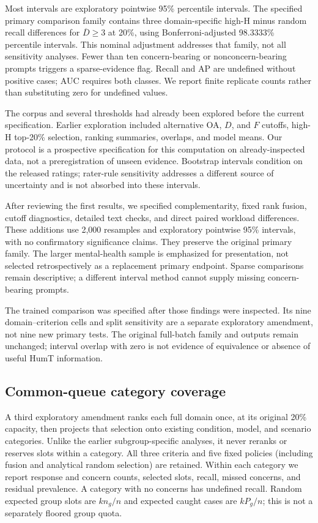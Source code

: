 \documentclass[manuscript,screen,review,anonymous]{acmart}
\newcommand{\Dcrit}{\ensuremath{\overline{D}\geq 3}}
\begin{document}
Most intervals are exploratory pointwise 95\% percentile intervals. The specified primary comparison family contains three domain-specific high-H minus random recall differences for \Dcrit{} at 20\%, using Bonferroni-adjusted 98.3333\% percentile intervals. This nominal adjustment addresses that family, not all sensitivity analyses. Fewer than ten concern-bearing or nonconcern-bearing prompts triggers a sparse-evidence flag. Recall and AP are undefined without positive cases; AUC requires both classes. We report finite replicate counts rather than substituting zero for undefined values.

The corpus and several thresholds had already been explored before the current specification. Earlier exploration included alternative OA, $D$, and $F$ cutoffs, high-H top-20\% selection, ranking summaries, overlaps, and model means. Our protocol is a prospective specification for this computation on already-inspected data, not a preregistration of unseen evidence. Bootstrap intervals condition on the released ratings; rater-rule sensitivity addresses a different source of uncertainty and is not absorbed into these intervals.

After reviewing the first results, we specified complementarity, fixed rank fusion, cutoff diagnostics, detailed text checks, and direct paired workload differences. These additions use 2,000 resamples and exploratory pointwise 95\% intervals, with no confirmatory significance claims. They preserve the original primary family. The larger mental-health sample is emphasized for presentation, not selected retrospectively as a replacement primary endpoint. Sparse comparisons remain descriptive; a different interval method cannot supply missing concern-bearing prompts.

The trained comparison was specified after those findings were inspected. Its nine domain--criterion cells and split sensitivity are a separate exploratory amendment, not nine new primary tests. The original full-batch family and outputs remain unchanged; interval overlap with zero is not evidence of equivalence or absence of useful HumT information.

\subsection{Common-queue category coverage}
A third exploratory amendment ranks each full domain once, at its original 20\% capacity, then projects that selection onto existing condition, model, and scenario categories. Unlike the earlier subgroup-specific analyses, it never reranks or reserves slots within a category. All three criteria and five fixed policies (including fusion and analytical random selection) are retained. Within each category we report response and concern counts, selected slots, recall, missed concerns, and residual prevalence. A category with no concerns has undefined recall. Random expected group slots are $kn_g/n$ and expected caught cases are $kP_g/n$; this is not a separately floored group quota.
\end{document}
